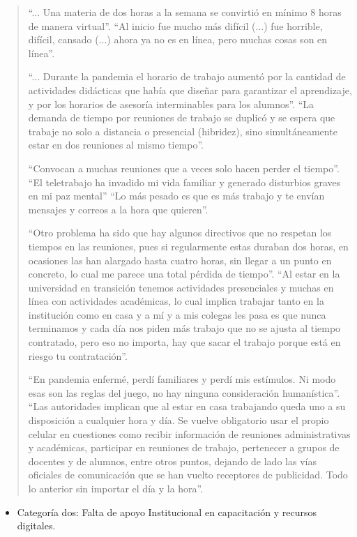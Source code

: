 \documentclass[spanish]{textolivre}
\begin{document}
\begin{quote}
 “... Una materia de dos horas a la semana se convirtió en mínimo 8 horas de manera virtual”. “Al inicio fue mucho más difícil (...) fue horrible, difícil, cansado (...) ahora ya no es en línea, pero muchas cosas son en línea”. 
 
“... Durante la pandemia el horario de trabajo aumentó por la cantidad de actividades didácticas que había que diseñar para garantizar el aprendizaje, y por los horarios de asesoría interminables para los alumnos”. “La demanda de tiempo por reuniones de trabajo se duplicó y se espera que trabaje no solo a distancia o presencial (hibridez), sino simultáneamente estar en dos reuniones al mismo tiempo”. 

“Convocan a muchas reuniones que a veces solo hacen perder el tiempo”. “El teletrabajo ha invadido mi vida familiar y generado disturbios graves en mi paz mental” “Lo más pesado es que es más trabajo y te envían mensajes y correos a la hora que quieren”. 

“Otro problema ha sido que hay algunos directivos que no respetan los tiempos en las reuniones, pues si regularmente estas duraban dos horas, en ocasiones las han alargado hasta cuatro horas, sin llegar a un punto en concreto, lo cual me parece una total pérdida de tiempo”. “Al estar en la universidad en transición tenemos actividades presenciales y muchas en línea con actividades académicas, lo cual implica trabajar tanto en la institución como en casa y a mí y a mis colegas les pasa es que nunca terminamos y cada día nos piden más trabajo que no se ajusta al tiempo contratado, pero eso no importa, hay que sacar el trabajo porque está en riesgo tu contratación”. 

“En pandemia enfermé, perdí familiares y perdí mis estímulos. Ni modo esas son las reglas del juego, no hay ninguna consideración humanística”. “Las autoridades implican que al estar en casa trabajando queda uno a su disposición a cualquier hora y día. Se vuelve obligatorio usar el propio celular en cuestiones como recibir información de reuniones administrativas y académicas, participar en reuniones de trabajo, pertenecer a grupos de docentes y de alumnos, entre otros puntos, dejando de lado las vías oficiales de comunicación que se han vuelto receptores de publicidad. Todo lo anterior sin importar el día y la hora”. 
\end{quote}

\begin{itemize}
 \item Categoría dos: Falta de apoyo Institucional en capacitación y recursos digitales.
\end{itemize}
\end{document}
